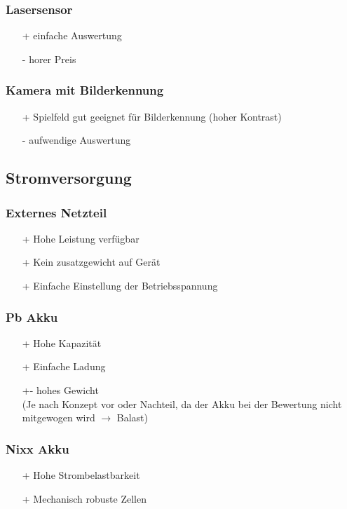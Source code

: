 \subsubsection{Lasersensor}
\begin{itemize}
    \item[+] einfache Auswertung
    \item[-] horer Preis
\end{itemize}

\subsubsection{Kamera mit Bilderkennung}
\begin{itemize}
    \item[+] Spielfeld gut geeignet für Bilderkennung (hoher Kontrast)
    \item[-] aufwendige Auswertung
\end{itemize}

\subsection{Stromversorgung}

\subsubsection{Externes Netzteil}
\begin{itemize}
    \item[+] Hohe Leistung verfügbar
    \item[+] Kein zusatzgewicht auf Gerät
    \item[+] Einfache Einstellung der Betriebsspannung
\end{itemize}

\subsubsection{Pb Akku}
\begin{itemize}
    \item[+] Hohe Kapazität
    \item[+] Einfache Ladung
    \item[+-]hohes Gewicht \\
        (Je nach Konzept vor oder Nachteil, da der Akku bei der Bewertung nicht mitgewogen wird 
        $\to$ Balast)
\end{itemize}

\subsubsection{Nixx Akku}
\begin{itemize}
    \item[+] Hohe Strombelastbarkeit
    \item[+] Mechanisch robuste Zellen
\end{itemize}

